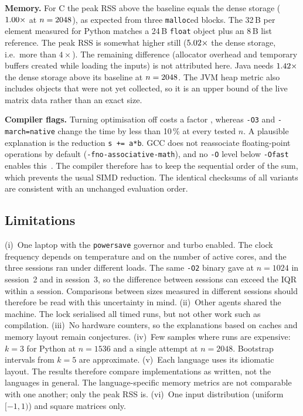 \documentclass[conference,a4paper]{IEEEtran}
\begin{document}
\textbf{Memory.} For C the peak RSS above the baseline equals the dense storage ($1.00\times$ at
$n=2048$), as expected from three \texttt{malloc}ed blocks. The 32\,B per element measured for Python matches
a 24\,B \texttt{float} object plus an 8\,B list reference. The peak RSS is somewhat higher still
($5.02\times$ the dense storage, i.e.\ more than $4\times$). The remaining difference
(allocator overhead and temporary buffers created while loading the inputs) is not attributed here. Java needs
$1.42\times$ the dense storage above its baseline at $n=2048$. The JVM heap metric also
includes objects that were not yet collected, so it is an upper bound of the live matrix data rather than an exact
size.

\textbf{Compiler flags.} Turning optimisation off costs a factor \CflagsOzeroOverOtwo{}, whereas \texttt{-O3} and
\texttt{-march=native} change the time by less than 10\,\% at every tested $n$. A plausible explanation is the reduction
\texttt{s += a*b}. GCC does not reassociate floating-point operations by default (\texttt{-fno-associative-math}),
and no \texttt{-O} level below \texttt{-Ofast} enables this~\cite{gccopt}. The compiler therefore has to keep the
sequential order of the sum, which prevents the usual SIMD reduction. The identical checksums of all variants are
consistent with an unchanged evaluation order.

\subsection{Limitations}
(i)~One laptop with the \texttt{powersave} governor and turbo enabled. The clock frequency depends on temperature
and on the number of active cores, and the three sessions ran under different loads. The same \texttt{-O2} binary
gave \TCTenTwentyFour{} at $n=1024$ in session~2 and \CflagsOtwoMedian{} in session~3, so the difference between
sessions can exceed the IQR within a session. Comparisons between sizes measured in different sessions should
therefore be read with this uncertainty in mind.
(ii)~Other agents shared the machine. The lock serialised all timed runs, but not other work such as compilation.
(iii)~No hardware counters, so the explanations based on caches and memory layout remain conjectures.
(iv)~Few samples where runs are expensive: $k=3$ for Python at $n=1536$ and a single attempt at $n=2048$.
Bootstrap intervals from $k=5$ are approximate.
(v)~Each language uses its idiomatic layout. The results therefore compare implementations as written, not the
languages in general. The language-specific memory metrics are not comparable with one another; only the peak RSS
is.
(vi)~One input distribution (uniform $[-1,1)$) and square matrices only.
\end{document}
